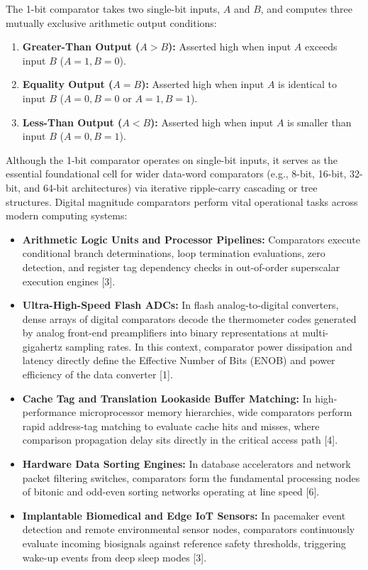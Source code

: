 \documentclass[12pt,a4paper,oneside]{report}
\begin{document}
The 1-bit comparator takes two single-bit inputs, $A$ and $B$, and computes three mutually exclusive arithmetic output conditions:
\begin{enumerate}
\item \textbf{Greater-Than Output ($A>B$):} Asserted high when input $A$ exceeds input $B$ ($A=1, B=0$).
\item \textbf{Equality Output ($A=B$):} Asserted high when input $A$ is identical to input $B$ ($A=0, B=0$ or $A=1, B=1$).
\item \textbf{Less-Than Output ($A<B$):} Asserted high when input $A$ is smaller than input $B$ ($A=0, B=1$).
\end{enumerate}

Although the 1-bit comparator operates on single-bit inputs, it serves as the essential foundational cell for wider data-word comparators (e.g., 8-bit, 16-bit, 32-bit, and 64-bit architectures) via iterative ripple-carry cascading or tree structures. Digital magnitude comparators perform vital operational tasks across modern computing systems:
\begin{itemize}
\item \textbf{Arithmetic Logic Units and Processor Pipelines:} Comparators execute conditional branch determinations, loop termination evaluations, zero detection, and register tag dependency checks in out-of-order superscalar execution engines [3].
\item \textbf{Ultra-High-Speed Flash ADCs:} In flash analog-to-digital converters, dense arrays of digital comparators decode the thermometer codes generated by analog front-end preamplifiers into binary representations at multi-gigahertz sampling rates. In this context, comparator power dissipation and latency directly define the Effective Number of Bits (ENOB) and power efficiency of the data converter [1].
\item \textbf{Cache Tag and Translation Lookaside Buffer Matching:} In high-performance microprocessor memory hierarchies, wide comparators perform rapid address-tag matching to evaluate cache hits and misses, where comparison propagation delay sits directly in the critical access path [4].
\item \textbf{Hardware Data Sorting Engines:} In database accelerators and network packet filtering switches, comparators form the fundamental processing nodes of bitonic and odd-even sorting networks operating at line speed [6].
\item \textbf{Implantable Biomedical and Edge IoT Sensors:} In pacemaker event detection and remote environmental sensor nodes, comparators continuously evaluate incoming biosignals against reference safety thresholds, triggering wake-up events from deep sleep modes [3].
\end{itemize}
\end{document}
